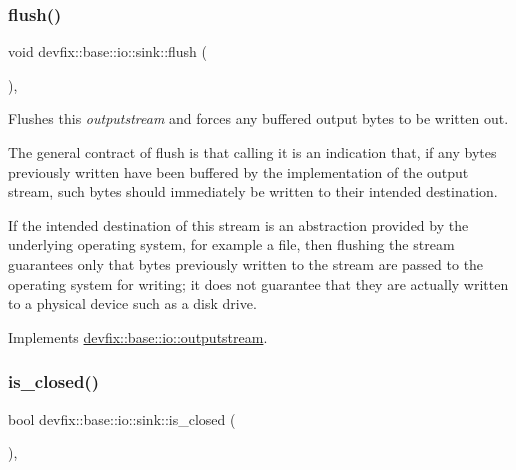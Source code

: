 \mbox{\label{structdevfix_1_1base_1_1io_1_1sink_ae19459626df6d3c9ad313e2171a67c3f}} 
\subsubsection{\texorpdfstring{flush()}{flush()}}
{\footnotesize\ttfamily void devfix\+::base\+::io\+::sink\+::flush (\begin{DoxyParamCaption}{ }\end{DoxyParamCaption})\hspace{0.3cm}{\ttfamily [override]}, {\ttfamily [virtual]}}



Flushes this {\itshape outputstream} and forces any buffered output bytes to be written out. 

The general contract of flush is that calling it is an indication that, if any bytes previously written have been buffered by the implementation of the output stream, such bytes should immediately be written to their intended destination.

If the intended destination of this stream is an abstraction provided by the underlying operating system, for example a file, then flushing the stream guarantees only that bytes previously written to the stream are passed to the operating system for writing; it does not guarantee that they are actually written to a physical device such as a disk drive. 

Implements \hyperlink{structdevfix_1_1base_1_1io_1_1outputstream_a3fe3b34675a2d70331e6ca235388e0cc}{devfix\+::base\+::io\+::outputstream}.

\mbox{\label{structdevfix_1_1base_1_1io_1_1sink_a7d006bfd462ad29884aef9f6a7f40006}} 
\subsubsection{\texorpdfstring{is\+\_\+closed()}{is\_closed()}}
{\footnotesize\ttfamily bool devfix\+::base\+::io\+::sink\+::is\+\_\+closed (\begin{DoxyParamCaption}{ }\end{DoxyParamCaption})\hspace{0.3cm}{\ttfamily [override]}, {\ttfamily [virtual]}}



